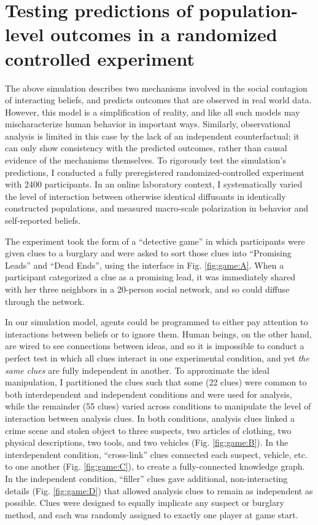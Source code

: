 \documentclass[9pt,twocolumn,twoside,lineno]{pnas-new}
\begin{document}
\section*{Testing predictions of population-level outcomes in a randomized controlled experiment}
The above simulation describes two mechanisms involved in the social contagion of interacting beliefs, and predicts outcomes that are observed in real world data. However, this model is a simplification of reality, and like all such models may mischaracterize human behavior in important ways. Similarly, observational analysis is limited in this case by the lack of an independent counterfactual; it can only show consistency with the predicted outcomes, rather than causal evidence of the mechanisms themselves. To rigorously test the simulation’s predictions, I conducted a fully preregistered randomized-controlled experiment with 2400 participants. In an online laboratory context, I systematically varied the level of interaction between otherwise identical diffusants in identically constructed populations, and measured macro-scale polarization in behavior and self-reported beliefs. 

The experiment took the form of a ``detective game'' in which participants were given clues to a burglary and were asked to sort those clues into ``Promising Leads'' and ``Dead Ends'', using the interface in Fig. \ref{fig:game:A}.  When a participant categorized a clue as a promising lead, it was immediately shared with her three neighbors in a 20-person social network, and so could diffuse through the network. 

In our simulation model, agents could be programmed to either pay attention to interactions between beliefs or to ignore them.
Human beings, on the other hand, are wired to see connections between ideas, and so it is impossible to conduct a perfect test in which all clues interact in one experimental condition, and yet \textit{the same clues} are fully independent in another. To approximate the ideal manipulation, I partitioned the clues such that some (22 clues) were common to both interdependent and independent conditions and were used for analysis, while the remainder (55 clues) varied across conditions to manipulate the level of interaction between analysis clues. In both conditions, analysis clues linked a crime scene and stolen object to three suspects, two articles of clothing, two physical descriptions, two tools, and two vehicles (Fig. \ref{fig:game:B}). In the interdependent condition, ``cross-link'' clues connected each suspect, vehicle, etc. to one another (Fig. \ref{fig:game:C}), to create a fully-connected knowledge graph. In the independent condition, ``filler'' clues gave additional, non-interacting details (Fig. \ref{fig:game:D}) that allowed analysis clues to remain as independent as possible. Clues were designed to equally implicate any suspect or burglary method, and each was randomly assigned to exactly one player at game start. 
\end{document}
